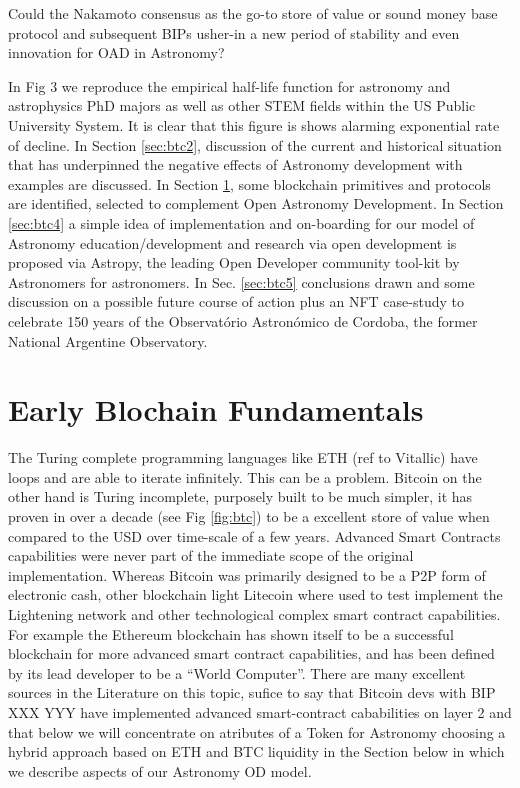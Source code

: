 \documentclass[final,5p,times,twocolumn,authoryear]{elsarticle}
\begin{document}
Could the Nakamoto consensus as the go-to store of value or sound money base protocol and subsequent BIPs usher-in a new period of stability and even innovation for OAD in Astronomy? 

In Fig 3 we reproduce the empirical half-life function for astronomy and astrophysics PhD majors as well as other STEM fields within the US Public University System. It is clear that this figure is shows alarming exponential rate of decline.  In Section \ref{sec:btc2}, discussion of the current and historical situation that has underpinned the negative effects of Astronomy development with examples are discussed. In Section  \ref{sec:btc3}, some blockchain primitives and protocols are identified, selected to complement Open Astronomy Development.  In Section \ref{sec:btc4} a simple idea of implementation and on-boarding for our model of Astronomy education/development and research via open development is proposed via Astropy, the leading Open Developer community tool-kit by Astronomers for astronomers. In Sec. \ref{sec:btc5} conclusions drawn and some discussion on a possible future course of action plus an NFT case-study to celebrate 150 years of the Observat\'orio Astron\'omico de Cordoba, the former National Argentine Observatory. 

\section{Early Blochain Fundamentals}
\label{sec:btc3}

The Turing complete programming languages like ETH (ref to Vitallic) have loops and are able to iterate infinitely. This can be a problem.  Bitcoin on the other hand is Turing incomplete, purposely built to be much simpler, it has proven in over a decade (see Fig \ref{fig:btc}) to be a excellent store of value when compared to the USD over time-scale of a few years. Advanced Smart Contracts capabilities were never part of the immediate scope of the original implementation. Whereas Bitcoin was primarily designed to be a P2P form of electronic cash, other blockchain light Litecoin where used to test implement the Lightening network and other technological complex smart contract capabilities. For example the Ethereum blockchain has shown itself to be a successful blockchain for more advanced smart contract capabilities, and has been defined by its lead developer to be a “World Computer”. There are many excellent sources in the Literature on this topic, sufice to say that Bitcoin devs with BIP XXX YYY have implemented advanced smart-contract cababilities on layer 2 and that below we will concentrate on atributes of a Token for Astronomy choosing a hybrid approach based on ETH and BTC liquidity in the Section below in which we describe aspects of our Astronomy OD model.
 
\end{document}

